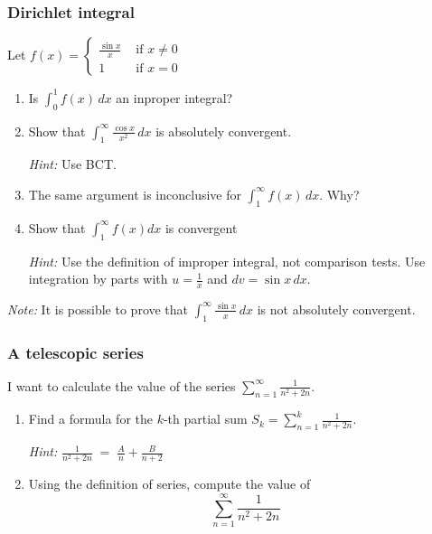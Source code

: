 \documentclass[14pt]{beamer}
\begin{document}
\begin{frame}[t]
	\fontsize{12}{12}\selectfont
	\frametitle{Dirichlet integral}

	Let $\displaystyle f(x) =
	\begin{cases}
		\frac{\sin x}{x} & \text{ if } x \neq 0 \\
		1                & \text{ if } x = 0
	\end{cases}$
	\vspace{.1cm}

	\begin{enumerate}
		\item Is \; $\displaystyle \int_{0}^{1}\! f(x) \, dx$ \; an inproper integral?

		\item Show that \; $\displaystyle \int_{1}^{\infty}\frac{\cos x}{x^{2}}\, dx$
			\;is absolutely convergent.
			\vspace{.1cm}

			\emph{Hint:} Use BCT.

		\item The same argument is inconclusive for $\displaystyle \int_{1}^{\infty}\!
			\! f(x) \, dx$. Why?

		\item Show that \; $\displaystyle \int_{1}^{\infty}\! \! f(x) dx$ \; is convergent
			\vspace{.1cm}

			\emph{Hint:} Use the definition of improper integral, not comparison tests.
			Use integration by parts with $u=\frac{1}{x}$ and $dv= \sin x \,dx$.
			\vspace{.1cm}
	\end{enumerate}

	{\fontsize{10}{10}\selectfont \emph{Note:} It is possible to prove that \; $\displaystyle \int_{1}^{\infty}\! \! \frac{\sin x}{x}\, dx$ is not absolutely convergent. }
\end{frame}

\begin{frame}[t]
	\fontsize{13}{13}\selectfont
	\frametitle{A telescopic series}
	I want to calculate the value of the series \;
	$\displaystyle \sum_{n=1}^{\infty}\frac{1}{n^{2}+2n}.$
	\vspace{.5cm}
	\begin{enumerate}
		\item Find a formula for the $k$-th partial sum $\displaystyle S_{k}= \sum_{n=1}
			^{k}\frac{1}{n^{2}+2n}.$

			\emph{Hint:} \; $\displaystyle \frac{1}{n^{2}+2n}\; = \; \frac{A}{n}+ \frac{B}{n+2}$
			\vspace{.5cm}

		\item Using the definition of series, compute the value of
			\[
				\sum_{n=1}^{\infty}\frac{1}{n^{2}+2n}
			\]
	\end{enumerate}
\end{frame}
\end{document}
